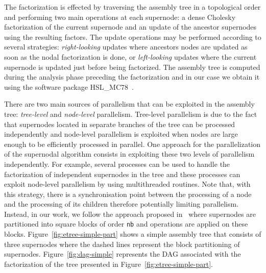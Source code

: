 \documentclass{article}
\begin{document}
The factorization is effected by traversing the assembly tree in a
topological order and performing two main operations at each
supernode: a dense Cholesky factorization of the current supernode and
an update of the ancestor supernodes using the resulting factors.
The update operations may be performed according
to several strategies: \textit{right-looking} updates where ancestors
nodes are updated as soon as the nodal factorization is done, or
\textit{left-looking} updates where the current supernode is updated
just before being factorized. The assembly tree is computed during the
analysis phase preceding the factorization and in our case we obtain
it using the software package HSL\_MC78~\cite{h.s:10}.

There are two main sources of parallelism that can be exploited in the
assembly tree: \textit{tree-level} and
\textit{node-level} parallelism. Tree-level parallelism is due to
the fact that supernodes located in separate branches of the tree can
be processed independently and node-level parallelism is exploited
when nodes are large enough to be efficiently processed
in parallel. One approach for the parallelization of the
supernodal algorithm consists in exploiting these two levels of
parallelism independently. For example, several processes can be used
to handle the factorization of independent supernodes in the tree and
these processes can exploit node-level parallelism by using
multithreaded routines. Note that, with this strategy, there is a
synchronisation point between the processing of a node and the
processing of its children therefore potentially limiting
parallelism. Instead, in our work, we follow the approach proposed
in~\cite{h.r.s:10} where supernodes are partitioned into square blocks
of order \texttt{nb} and operations are applied on these
blocks. Figure~\ref{fig:etree-simple-part} shows a simple assembly
tree that consists of three supernodes where the dashed lines
represent the block partitioning of
supernodes. Figure~\ref{fig:dag-simple} represents the DAG associated
with the factorization of the tree presented in
Figure~\ref{fig:etree-simple-part}.
\end{document}
